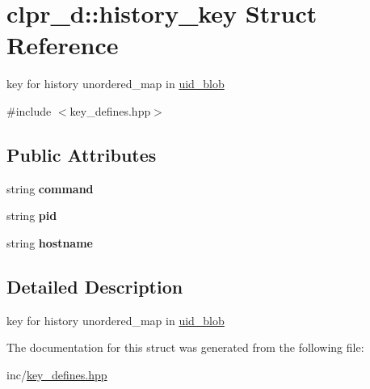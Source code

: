 \hypertarget{structclpr__d_1_1history__key}{\section{clpr\-\_\-d\-:\-:history\-\_\-key \-Struct \-Reference}
\label{structclpr__d_1_1history__key}
}


key for history unordered\-\_\-map in \hyperlink{classclpr__d_1_1uid__blob}{uid\-\_\-blob}  




{\ttfamily \#include $<$key\-\_\-defines.\-hpp$>$}

\subsection*{\-Public \-Attributes}
\begin{DoxyCompactItemize}
\item 
\hypertarget{structclpr__d_1_1history__key_a1b012bdfb92a24f029726ad7c94cea83}{string {\bfseries command}}\label{structclpr__d_1_1history__key_a1b012bdfb92a24f029726ad7c94cea83}

\item 
\hypertarget{structclpr__d_1_1history__key_a088fe63dd3b8090c17b3588e9e16cdb3}{string {\bfseries pid}}\label{structclpr__d_1_1history__key_a088fe63dd3b8090c17b3588e9e16cdb3}

\item 
\hypertarget{structclpr__d_1_1history__key_af5fa7b37415288533e697f14e6ca2405}{string {\bfseries hostname}}\label{structclpr__d_1_1history__key_af5fa7b37415288533e697f14e6ca2405}

\end{DoxyCompactItemize}


\subsection{\-Detailed \-Description}
key for history unordered\-\_\-map in \hyperlink{classclpr__d_1_1uid__blob}{uid\-\_\-blob} 

\-The documentation for this struct was generated from the following file\-:\begin{DoxyCompactItemize}
\item 
inc/\hyperlink{key__defines_8hpp}{key\-\_\-defines.\-hpp}\end{DoxyCompactItemize}
